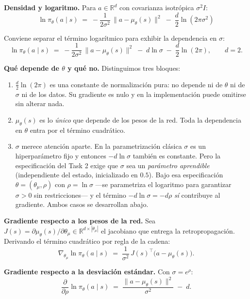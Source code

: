 \documentclass[11pt,letterpaper]{article}
\newcommand{\lead}[1]{\textbf{#1}}
\begin{document}
\begin{respuesta}
\lead{Densidad y logaritmo.} Para $a \in \mathbb{R}^d$ con covarianza isotrópica
$\sigma^2 I$:
\[
  \ln \pi_\theta(a \mid s) \;=\; -\frac{1}{2\sigma^{2}}\,\lVert a - \mu_\theta(s) \rVert^{2}
  \;-\; \frac{d}{2}\ln\!\left(2\pi\sigma^{2}\right)
\]

\medskip
Conviene separar el término logarítmico para exhibir la dependencia en $\sigma$:
\[
  \ln \pi_\theta(a \mid s) \;=\; -\frac{1}{2\sigma^{2}}\,\lVert a - \mu_\theta(s) \rVert^{2}
  \;-\; d\ln\sigma \;-\; \frac{d}{2}\ln(2\pi), \qquad d = 2.
\]

\medskip
\lead{Qué depende de $\theta$ y qué no.} Distinguimos tres bloques:

\begin{enumerate}[leftmargin=1.4em,itemsep=2pt]
  \item $\tfrac{d}{2}\ln(2\pi)$ es una constante de normalización pura: no depende ni de
        $\theta$ ni de $\sigma$ ni de los datos. Su gradiente es nulo y en la
        implementación puede omitirse sin alterar nada.
  \item $\mu_\theta(s)$ es lo \emph{único} que depende de los pesos de la red. Toda la
        dependencia en $\theta$ entra por el término cuadrático.
  \item $\sigma$ merece atención aparte. En la parametrización clásica $\sigma$ es un
        hiperparámetro fijo y entonces $-d\ln\sigma$ también es constante. Pero la
        especificación del Task 2 exige que $\sigma$ sea un \emph{parámetro aprendible}
        (independiente del estado, inicializado en $0.5$). Bajo esa especificación
        $\theta = (\theta_\mu, \rho)$ con $\rho = \ln\sigma$ —se parametriza el
        logaritmo para garantizar $\sigma > 0$ sin restricciones— y el término
        $-d\ln\sigma = -d\rho$ \emph{sí} contribuye al gradiente. Ambos casos se
        desarrollan abajo.
\end{enumerate}

\medskip
\lead{Gradiente respecto a los pesos de la red.} Sea
$J(s) = \partial \mu_\theta(s)/\partial\theta_\mu \in \mathbb{R}^{d\times|\theta_\mu|}$ el
jacobiano que entrega la retropropagación. Derivando el término cuadrático por regla de
la cadena:
\[
  \nabla_{\theta_\mu} \ln \pi_\theta(a \mid s)
  \;=\; \frac{1}{\sigma^{2}}\, J(s)^{\!\top}\big(a - \mu_\theta(s)\big).
\]

\medskip
\lead{Gradiente respecto a la desviación estándar.} Con $\sigma = e^{\rho}$:
\[
  \frac{\partial}{\partial \rho}\ln \pi_\theta(a\mid s)
  \;=\; \frac{\lVert a - \mu_\theta(s)\rVert^{2}}{\sigma^{2}} \;-\; d.
\]


\end{respuesta}
\end{document}
